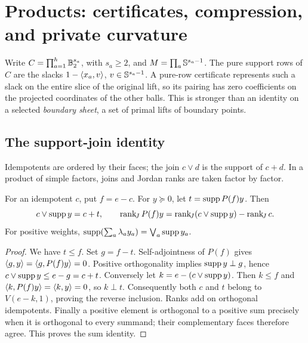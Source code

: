 \section{Products: certificates, compression, and private curvature}\label{sec:products}
Write $C=\prod_{a=1}^h\mathbb B_2^{s_a}$, with $s_a\geq2$, and
$M=\prod_a\mathbb S^{s_a-1}$. The pure support rows of $C$ are the slacks
$1-\langle x_a,v\rangle$, $v\in\mathbb S^{s_a-1}$. A pure-row certificate represents
such a slack on the entire slice of the original lift, so its pairing has
zero coefficients on the projected coordinates of the other balls. This
is stronger than an identity on a selected \emph{boundary sheet}, a set
of primal lifts of boundary points.

\subsection{The support-join identity}
Idempotents are ordered by their faces; the join $c\vee d$ is the
support of $c+d$. In a product of simple factors, joins and Jordan ranks
are taken factor by factor.
\begin{lemma}\label{lem:join}
For an idempotent $c$, put $f=e-c$. For $y\succeq0$, let
$t=\operatorname{supp} P(f)y$. Then
\[
 c\vee\operatorname{supp} y=c+t,\qquad
 \operatorname{rank}_{\!J} P(f)y=\operatorname{rank}_{\!J}(c\vee\operatorname{supp} y)-\operatorname{rank}_{\!J} c.
\]
For positive weights, $\operatorname{supp}(\sum_a\lambda_a y_a)=\bigvee_a\operatorname{supp} y_a$.
\end{lemma}
\begin{proof}
We have $t\leq f$. Set $g=f-t$. Self-adjointness of $P(f)$ gives
$\langle g,y\rangle=\langle g,P(f)y\rangle=0$. Positive orthogonality implies
$\operatorname{supp} y\perp g$, hence $c\vee\operatorname{supp} y\leq e-g=c+t$.
Conversely let $k=e-(c\vee\operatorname{supp} y)$. Then $k\leq f$ and
$\langle k,P(f)y\rangle=\langle k,y\rangle=0$, so $k\perp t$. Consequently both $c$ and $t$
belong to $V(e-k,1)$, proving the reverse inclusion. Ranks add on
orthogonal idempotents. Finally a positive element is orthogonal to a
positive sum precisely when it is orthogonal to every summand; their
complementary faces therefore agree. This proves the sum identity.
\end{proof}

